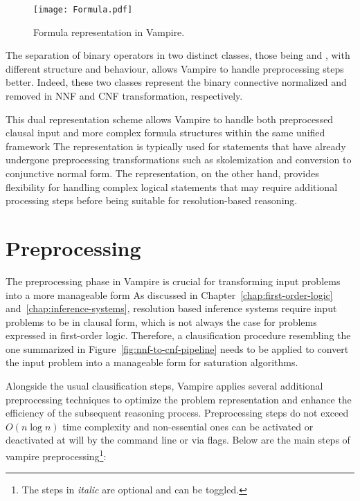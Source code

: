 \begin{figure}[htbp]
  \centering
  \texttt{[image: Formula.pdf]}
  \caption{Formula representation in Vampire.}\label{fig:formula-representation}
\end{figure}

The separation of binary operators in two distinct classes, those being  and , with different structure and behaviour, allows Vampire to handle preprocessing steps better.
Indeed, these two classes represent the binary connective normalized and removed in NNF and CNF transformation, respectively.

This dual representation scheme allows Vampire to handle both preprocessed clausal input and more complex formula structures within the same unified framework
The  representation is typically used for statements that have already undergone preprocessing transformations such as skolemization and conversion to conjunctive normal form.
The  representation, on the other hand, provides flexibility for handling complex logical statements that may require additional processing steps before being suitable for resolution-based reasoning.

\section{Preprocessing}\label{sec:preprocessing}

The preprocessing phase in Vampire is crucial for transforming input problems into a more manageable form
As discussed in Chapter~\ref{chap:first-order-logic} and~\ref{chap:inference-systems}, resolution based inference systems require input problems to be in clausal form, which is not always the case for problems expressed in first-order logic.
Therefore, a clausification procedure resembling the one summarized in Figure~\ref{fig:nnf-to-cnf-pipeline} needs to be applied to convert the input problem into a manageable form for saturation algorithms.

Alongside the usual clausification steps, Vampire applies several additional preprocessing techniques to optimize the problem representation and enhance the efficiency of the subsequent reasoning process.
Preprocessing steps do not exceed \(O(n\log{n})\) time complexity and non-essential ones can be activated or deactivated at will by the command line or via flags.
Below are the main steps of vampire preprocessing\footnote{The steps in \emph{italic} are optional and can be toggled.}:

